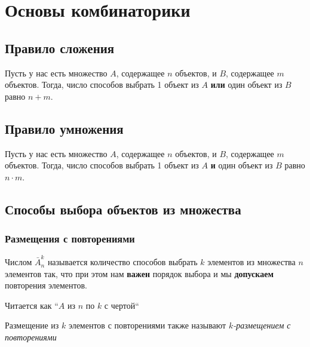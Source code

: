 \section{Основы комбинаторики}

\subsection{Правило сложения}

\begin{proposition}
	Пусть у нас есть множество $A$, содержащее $n$ объектов, и $B$, содержащее $m$ объектов. Тогда, число способов выбрать 1 объект из $A$ \textbf{или} один объект из $B$ равно $n + m$.
\end{proposition}

\subsection{Правило умножения}

\begin{proposition}
	Пусть у нас есть множество $A$, содержащее $n$ объектов, и $B$, содержащее $m$ объектов. Тогда, число способов выбрать 1 объект из $A$ \textbf{и} один объект из $B$ равно $n \cdot m$.
\end{proposition}

\subsection{Способы выбора объектов из множества}

\subsubsection*{Размещения с повторениями}

\begin{definition}
	Числом $\bar{A}_n^k$ называется количество способов выбрать $k$ элементов из множества $n$ элементов так, что при этом нам \textbf{важен} порядок выбора и мы \textbf{допускаем} повторения элементов.
\end{definition}

\begin{note}
	Читается как ``$A$ из $n$ по $k$ с чертой``
\end{note}

\begin{note}
	Размещение из $k$ элементов с повторениями также называют \textit{$k$-размещением с повторениями}
\end{note}

